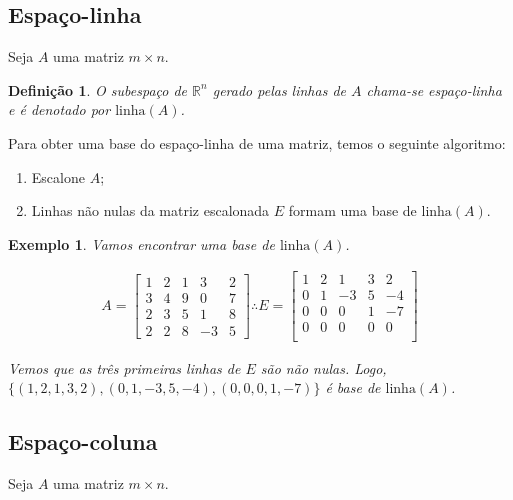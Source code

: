 \documentclass{article}
\newtheorem*{definition}{Definição}
\newtheorem*{example}{Exemplo}
\begin{document}
\subsection{Espaço-linha}
\hspace{12pt} Seja $A$ uma matriz $m\times n$. 

\begin{definition}
	O subespaço de $\mathbb{R}^n$ gerado pelas linhas de $A$ chama-se espaço-linha e é denotado por $\text{linha}(A)$.
\end{definition}

\par\vspace{0.3cm} Para obter uma base do espaço-linha de uma matriz, temos o seguinte algoritmo:

\begin{enumerate}
	\item Escalone $A$;
	\item Linhas não nulas da matriz escalonada $E$ formam uma base de $\text{linha}(A)$.
\end{enumerate}

\begin{example}
	Vamos encontrar uma base de $\text{linha}(A)$.
	
	\begin{align*}
	A = \begin{bmatrix}
	1 & 2 & 1 & 3 & 2 \\
	3 & 4 & 9 & 0 & 7 \\
	2 & 3 & 5 & 1 & 8\\
	2 & 2 & 8 & -3 & 5 
	\end{bmatrix}\therefore E = \begin{bmatrix}
	1 & 2 & 1 & 3 & 2 \\
	0 & 1 & -3 & 5 & -4 \\
	0 & 0 & 0 & 1 & -7 \\
	0 & 0 & 0 & 0 & 0 \\
	\end{bmatrix}
	\end{align*}
	
	\par\vspace{0.3cm} Vemos que as três primeiras linhas de $E$ são não nulas. Logo, $\{ (1, 2, 1, 3, 2), (0, 1, -3, 5, -4), (0, 0, 0, 1, -7) \}$ é base de $\text{linha}(A)$.
	
\end{example}

\subsection{Espaço-coluna}
\hspace{12pt} Seja $A$ uma matriz $m\times n$.
\end{document}
